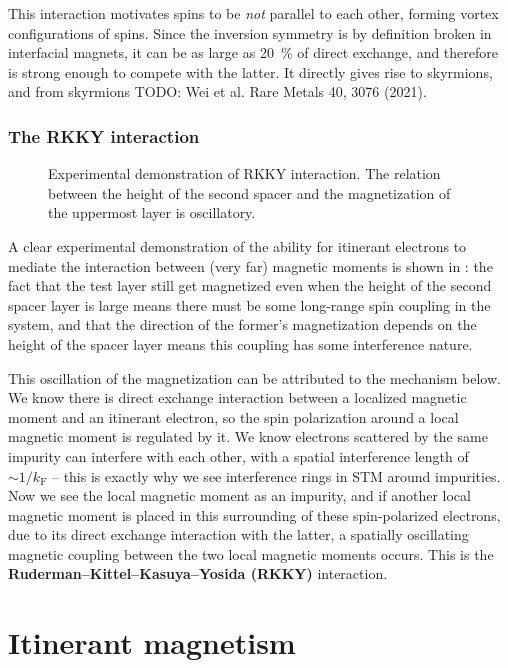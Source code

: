\documentclass[hyperref, a4paper]{article}
\newcommand*{\concept}[1]{{\textbf{#1}}}
\begin{document}
This interaction motivates 
spins to be \emph{not} parallel to each other, 
forming vortex configurations of spins. 
Since the inversion symmetry is by definition broken 
in interfacial magnets, 
it can be as large as \SI{20}{\percent} of direct exchange,
and therefore is strong enough to compete with the latter. 
It directly gives rise to skyrmions, 
and from skyrmions TODO: Wei et al. Rare Metals 40, 3076 (2021).

\subsubsection{The RKKY interaction}

\begin{figure}
    \centering
    
    \caption{Experimental demonstration of RKKY interaction. 
    The relation between the height of the second spacer 
    and the magnetization of the uppermost layer is oscillatory.}
    \label{fig:rkky-experiment}
\end{figure}

A clear experimental demonstration of the ability for itinerant electrons 
to mediate the interaction between (very far) magnetic moments 
is shown in :
the fact that the test layer still get magnetized 
even when the height of the second spacer layer is large 
means there must be some long-range spin coupling in the system,
and that the direction of the former's magnetization 
depends on the height of the spacer layer 
means this coupling has some interference nature. 

This oscillation of the magnetization can be attributed to the mechanism below.
We know there is direct exchange interaction 
between a localized magnetic moment and an itinerant electron, 
so the spin polarization around a local magnetic moment 
is regulated by it. 
We know electrons scattered by the same impurity can interfere with each other, 
with a spatial interference length of $\sim 1 / k_{\text{F}}$ -- 
this is exactly why we see interference rings in STM around impurities. 
Now we see the local magnetic moment as an impurity,
and if another local magnetic moment 
is placed in this surrounding of these spin-polarized electrons, 
due to its direct exchange interaction with the latter, 
a spatially oscillating magnetic coupling between the two local magnetic moments occurs. 
This is the \concept{Ruderman–Kittel–Kasuya–Yosida (RKKY)} interaction. 

\section{Itinerant magnetism}
\end{document}
